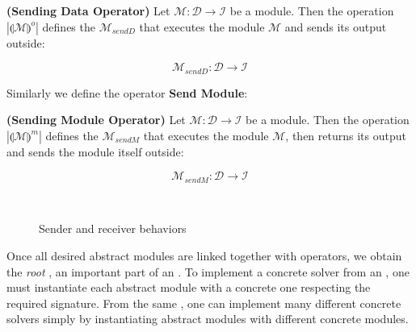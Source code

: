 \begin{definition}\label{op:osend}
{\bf (Sending Data Operator)} Let $\mathcal{M} : \mathcal{D} \rightarrow \mathcal{I}$ be a module. Then the operation $\left|\llparenthesis \mathcal{M}\rrparenthesis^{o}\right|$ defines the \cm{} $\mathcal{M}_{sendD}$ that executes the module $\mathcal{M}$ and sends its output outside:

\[
\mathcal{M}_{sendD}:\mathcal{D} \rightarrow \mathcal{I}
\]
\end{definition}

Similarly we define the operator \textbf{Send Module}:

\begin{definition}\label{op:msend}
{\bf (Sending Module Operator)} Let $\mathcal{M} : \mathcal{D} \rightarrow \mathcal{I}$ be a module. Then the operation $\left|\llparenthesis \mathcal{M}\rrparenthesis^{m}\right|$ defines the \cm{} $\mathcal{M}_{sendM}$ that executes the module $\mathcal{M}$, then returns its output and sends the module itself outside:

\[
\mathcal{M}_{sendM}:\mathcal{D} \rightarrow \mathcal{I}
\]
\end{definition}


\begin{figure}[h]
\centering
{}\\
\caption[]{Sender and receiver behaviors}
\label{fig:send_recv}
\end{figure}

Once all desired abstract modules are linked together with operators, we obtain the {\it root} \cm{}, an important part of an \as. To implement a concrete solver from an \as, one must instantiate each abstract module with a concrete one respecting the required signature. From the same \as, one can implement many different concrete solvers simply by instantiating abstract modules with different concrete modules.

